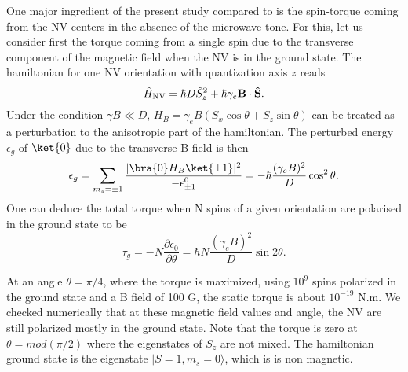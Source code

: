 \documentclass[preprintnumbers,amsmath,amssymb,superscriptaddress,twocolumn,showpacs]{revtex4-1}
\begin{document}

One major ingredient of the present study compared to \cite{DelordNat} is the spin-torque coming from the NV centers in the absence of the microwave tone.
For this, let us consider first the torque coming from a single spin due to the transverse component of the magnetic field when the NV is in the ground state.
The hamiltonian for one NV orientation with quantization axis $z$ reads 
\begin{equation}\hat{H}_{\rm NV}=\hbar D \hat{S}_z^2+ \hbar \gamma_e \bf B  \cdot \bf\hat S.
\end{equation}
Under the condition $\gamma B \ll D$, $H_{B}= \gamma_e B  ( S_x \cos\theta + S_z \sin\theta)$ can be treated as a perturbation to the anisotropic part of the hamiltonian. 
The perturbed energy $\epsilon_g$ of $\ket{0}$ due to the transverse B field is then
\begin{equation} \epsilon_g=\sum_{m_s=\pm 1}\frac{ |\bra{0} H_B \ket{\pm 1}|^2}{-\epsilon^0_{\pm 1}}=-\hbar\frac{(\gamma_e B)^2 }{D} \cos^2\theta.
\end{equation}
One can deduce the total torque when N spins of a given orientation are polarised in the ground state to be 
\begin{equation}\tau_g=-N \frac{\partial \epsilon_0}{\partial \theta}=\hbar N  \frac{(\gamma_e B)^2}{D} \sin 2\theta.\end{equation}

At an angle $\theta=\pi/4$, where the torque is maximized, using $10^9$ spins polarized in the ground state and a B field of 100 G, the static torque is about $10^{-19}$ N.m.
We checked numerically that at these magnetic field values and angle, the NV are still polarized mostly in the ground state. 
Note that the torque is zero at $\theta=mod (\pi/2)$ where the eigenstates of $S_z$ are not mixed. The hamiltonian ground state is the eigenstate $| S=1,m_s=0\rangle$, which is is non magnetic. 
\end{document}
